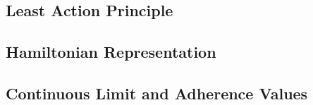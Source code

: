 \subsection{Least Action Principle}


\subsection{Hamiltonian Representation}

\subsection{Continuous Limit and Adherence Values}